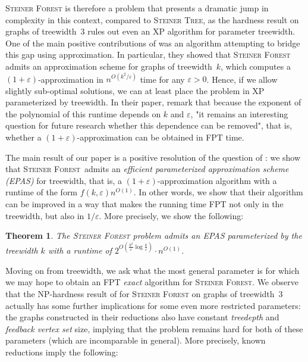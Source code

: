 \documentclass[a4paper]{article}
\let\oldcitet\citet
\renewcommand{\citet}[1]{\mbox{\oldcitet{#1}}}
\theoremstyle{plain}
\newtheorem{theorem}{Theorem}%
\newcommand{\eps}{{\varepsilon}}
\newcommand{\hy}{\hbox{-}\nobreak\hskip0pt}
\newcommand{\pname}[1]{\textsc{#1}}
\newcommand{\SF}{\pname{Steiner Forest}\xspace}
\newcommand{\ST}{\pname{Steiner Tree}\xspace}
\begin{document}
\SF is therefore a problem that presents a dramatic jump in complexity in this
context, compared to \ST, as the hardness result on graphs of treewidth~$3$
rules out even an XP algorithm for parameter treewidth. One of the main
positive contributions of \citet{bateni2011approximation} was an algorithm
attempting to bridge this gap using approximation. In particular, they showed
that \SF admits an approximation scheme for graphs of treewidth~$k$, which
computes a $(1+\eps)$\hy{}approximation in $n^{O(k^2/\eps)}$ time for any $\eps>0$. Hence, if we
allow slightly sub-optimal solutions, we can at least place the problem in XP
parameterized by treewidth. In their paper, \citet{bateni2011approximation}
remark that because the exponent of the polynomial of this runtime depends on
$k$ and $\eps$, "it remains an interesting question for future research whether
this dependence can be removed", that is, whether a $(1+\eps)$-approximation
can be obtained in FPT time.

The main result of our paper is a positive resolution of the question of
\citet{bateni2011approximation}: we show that \SF\ admits an \emph{efficient
parameterized approximation scheme (EPAS)} for treewidth, that is, a
$(1+\eps)$-approximation algorithm with a runtime of the form
$f(k,\eps)n^{O(1)}$. In other words, we show that their algorithm can be
improved in a way that makes the running time FPT not only in the treewidth,
but also in $1/\eps$. More precisely, we show the following:



\begin{theorem}\label{thm:tw-EPAS}
The \SF problem admits an EPAS parameterized by the treewidth $k$ with a runtime of $2^{O(\frac{k^2}{\eps}\log\frac{k}{\eps})}\cdot n^{O(1)}$.
\end{theorem}


%

Moving on from treewidth, we ask what the most general
parameter is for which we may hope to obtain an FPT \emph{exact} algorithm for
\SF. We observe that the NP-hardness result of \citet{gassner2010steiner,
bateni2011approximation} for \SF on graphs of treewidth~$3$ actually has some
further implications for some even more restricted parameters: the graphs
constructed in their reductions also have constant \emph{treedepth} and
\emph{feedback vertex set} size, implying that the problem remains hard for
both of these parameters (which are incomparable in general). More
precisely, known reductions imply the following:
\end{document}
